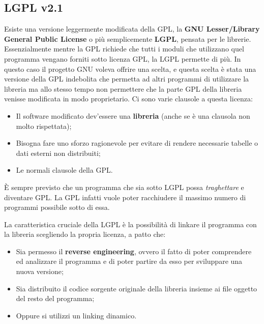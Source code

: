 \subsection{LGPL v2.1}

Esiste una versione leggermente modificata della GPL, la \textbf{GNU Lesser/Library General Public License} o più semplicemente \textbf{LGPL}, pensata per le librerie. Essenzialmente mentre la GPL richiede che tutti i moduli che utilizzano quel programma vengano forniti sotto licenza GPL, la LGPL permette di più. In questo caso il progetto GNU voleva offrire una scelta, e questa scelta è stata una versione della GPL indebolita che permetta ad altri programmi di utilizzare la libreria ma allo stesso tempo non permettere che la parte GPL della libreria venisse modificata in modo proprietario. Ci sono varie clausole a questa licenza:

\begin{itemize}

\item Il software modificato dev'essere una \textbf{libreria} (anche se è una clausola non molto rispettata);
\item Bisogna fare uno sforzo ragionevole per evitare di rendere necessarie tabelle o dati esterni non distribuiti;
\item Le normali clausole della GPL.

\end{itemize}

È sempre previsto che un programma che sia sotto LGPL possa \textit{traghettare} e diventare GPL. La GPL infatti vuole poter racchiudere il massimo numero di programmi possibile sotto di essa.

La caratteristica cruciale della LGPL è la possibilità di linkare il programma con la libreria scegliendo la propria licenza, a patto che:

\begin{itemize}

\item Sia permesso il \textbf{reverse engineering}, ovvero il fatto di poter comprendere ed analizzare il programma e di poter partire da esso per sviluppare una nuova versione;
\item Sia distribuito il codice sorgente originale della libreria insieme ai file oggetto del resto del programma;
\item Oppure si utilizzi un linking dinamico.

\end{itemize}


